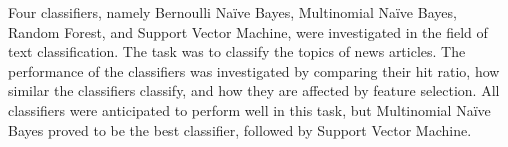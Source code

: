 Four classifiers, namely Bernoulli Naïve Bayes, Multinomial Naïve Bayes, Random Forest, and Support Vector Machine, were investigated in the field of text classification. The task was to classify the topics of news articles. The performance of the classifiers was investigated by comparing their hit ratio, how similar the classifiers classify, and how they are affected by feature selection. All classifiers were anticipated to perform well in this task, but Multinomial Naïve Bayes proved to be the best classifier, followed by Support Vector Machine.